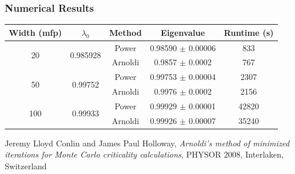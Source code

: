 \documentclass[color={usenames, dvipsnames},ignorenonframetext]{beamer}
\begin{document}
\begin{frame}
    \frametitle{Numerical Results}
\begin{table}[h]
    \centering
    \begin{tabular}{ccccc}
        \toprule
        Width (mfp) & $\lambda_0$ & Method & Eigenvalue &  Runtime (s) \\
        \midrule
        \multirow{2}{5mm}{20} & \multirow{2}{15mm}{0.985928} & Power & 0.98590 $\pm$ 0.00006 & 833 \\
                           & & Arnoldi & 0.9857 $\pm$ 0.0002 & 767 \\
        \midrule
        \multirow{2}{5mm}{50} & \multirow{2}{15mm}{0.99752} & Power & 0.99753 $\pm$ 0.00004 & 2307 \\
                           & & Arnoldi & 0.9976 $\pm$ 0.0002 & 2156 \\
       \midrule
       \multirow{2}{5mm}{100} & \multirow{2}{15mm}{0.99933} & Power & 0.99929 $\pm$ 0.00001 & 42820 \\
                          & & Arnoldi & 0.99926 $\pm$ 0.00007 & 35240 \\
        \bottomrule
    \end{tabular}
    \label{tab:results}
\end{table}

\vspace{2ex}
{\scriptsize Jeremy Lloyd Conlin and James Paul Holloway, \emph{Arnoldi's method of minimized iterations for Monte Carlo criticality calculations}, PHYSOR 2008, Interlaken, Switzerland}
\end{frame}
\end{document}
